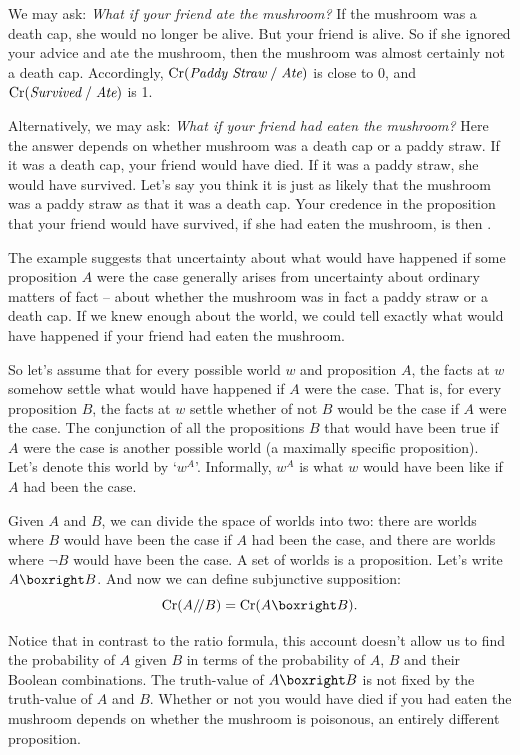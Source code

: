 {We may ask: \emph{What if your friend ate the mushroom?} If the mushroom was a
death cap, she would no longer be alive. But your friend is alive. So if she
ignored your advice and ate the mushroom, then the mushroom was almost certainly
not a death cap. Accordingly, $\text{Cr}(\emph{Paddy Straw}\;/\;\emph{Ate})$ is close
to 0, and $\text{Cr}(\emph{Survived}\;/\;\emph{Ate})$ is 1.

Alternatively, we may ask: \emph{What if your friend had eaten the mushroom?}
Here the answer depends on whether mushroom was a death cap or a paddy straw. If
it was a death cap, your friend would have died. If it was a paddy straw, she
would have survived. Let's say you think it is just as likely that the mushroom
was a paddy straw as that it was a death cap. Your credence in the proposition
that your friend would have survived, if she had eaten the mushroom, is then
.

The example suggests that uncertainty about what would have happened if some
proposition $A$ were the case generally arises from uncertainty about ordinary
matters of fact -- about whether the mushroom was in fact a paddy straw or a
death cap. If we knew enough about the world, we could tell exactly what would
have happened if your friend had eaten the mushroom.

So let's assume that for every possible world $w$ and proposition $A$, the facts
at $w$ somehow settle what would have happened if $A$ were the case. That is,
for every proposition $B$, the facts at $w$ settle whether of not $B$ would be
the case if $A$ were the case. The conjunction of all the propositions $B$ that
would have been true if $A$ were the case is another possible world (a maximally
specific proposition). Let's denote this world by `$w^A$'. Informally, $w^A$ is
what $w$ would have been like if $A$ had been the case.

Given $A$ and $B$, we can divide the space of worlds into two: there are worlds
where $B$ would have been the case if $A$ had been the case, and there are
worlds where $\neg B$ would have been the case. A set of worlds is a
proposition. Let's write $A \boxright B$. And now we can define subjunctive
supposition:
\[
  \Cr(A/\!/B) = \Cr(A \boxright B).
\]

Notice that in contrast to the ratio formula, this account doesn't allow us to
find the probability of $A$ given $B$ in terms of the probability of $A$, $B$
and their Boolean combinations. The truth-value of $A \boxright B$ is not fixed
by the truth-value of $A$ and $B$. Whether or not you would have died if you had
eaten the mushroom depends on whether the mushroom is poisonous, an entirely
different proposition.

}
